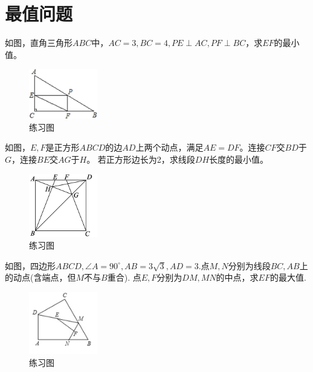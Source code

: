 \documentclass{ecnuthesis}
\begin{document}
\section{最值问题}
\begin{problem}
    如图，直角三角形$ABC$中，$AC=3,BC=4,PE\perp AC,PF\perp BC$，求$EF$的最小值。
\end{problem}
\begin{figure}[H]
\centering
\includegraphics[width=3cm]{picture/659.png}
\caption{练习图}
\end{figure}
\begin{problem}
    如图，$E,F$是正方形$ABCD$的边$AD$上两个动点，满足$AE=DF$。连接$CF$交$BD$于$G$，连接$BE$交$AG$于$H$。
    若正方形边长为2，求线段$DH$长度的最小值。
\end{problem}
\begin{figure}[H]
\centering
\includegraphics[width=3cm]{picture/649.png}
\caption{练习图}
\end{figure}
\begin{problem}
    如图，四边形$ABCD,\angle A=90^\circ,AB=3\sqrt3,AD=3$.点$M,N$分别为线段$BC,AB$上的动点(含端点，但$M$不与$B$重合).
    点$E,F$分别为$DM,MN$的中点，求$EF$的最大值.
\end{problem}
\begin{figure}[H]
\centering
\includegraphics[width=3cm]{picture/631.png}
\caption{练习图}
\end{figure}
\clearpage
\end{document}
